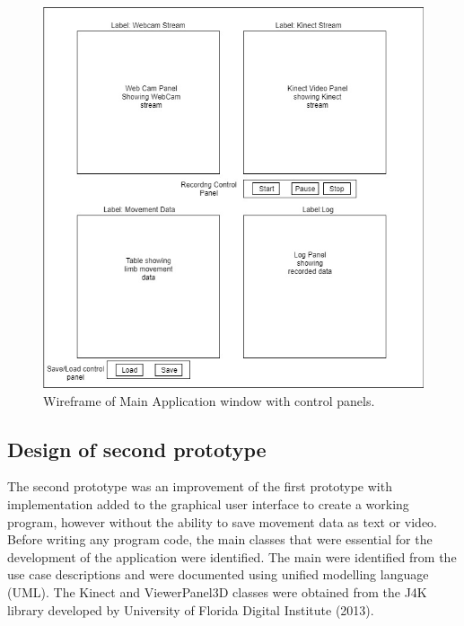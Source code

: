 \documentclass[a4paper, 12pt]{article}
\begin{document}
\begin{figure}
  \begin{center}
  \includegraphics[scale=0.7]{appgui2.jpg}
  	\caption{Wireframe of Main Application window with control panels.}
  \end{center} 
  \label{fig:appgui2} 
\end{figure}

\newpage
\newpage
 
\subsection{Design of second prototype}
The second prototype was an improvement of the first prototype with implementation added to the graphical user interface to create a working program, however without the ability to save movement data as text or video. Before writing any program code, the main classes that were essential for the development of the application were identified. The main were identified from the use case descriptions and were documented using unified modelling language (UML). The Kinect and ViewerPanel3D classes were obtained from the J4K library developed by University of Florida Digital Institute (2013). 
\end{document}
